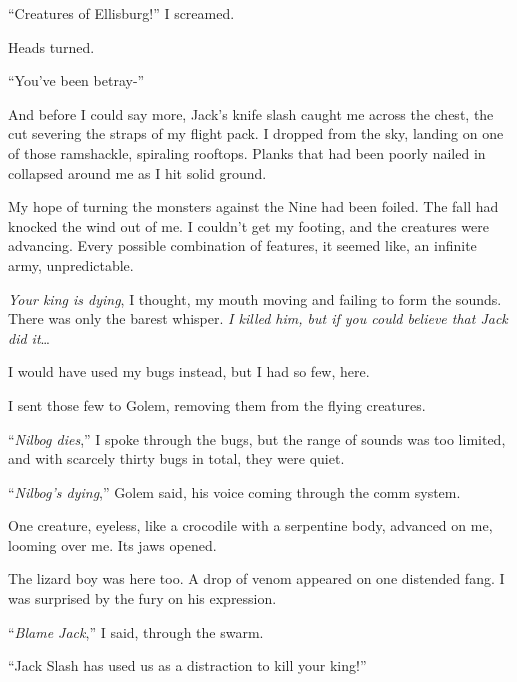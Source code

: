 ``Creatures of Ellisburg!'' I screamed.



Heads turned.



``You've been betray-''



And before I could say more, Jack's knife slash caught me across the chest, the cut severing the straps of my flight pack.  I dropped from the sky, landing on one of those ramshackle, spiraling rooftops.  Planks that had been poorly nailed in collapsed around me as I hit solid ground.



My hope of turning the monsters against the Nine had been foiled.  The fall had knocked the wind out of me.  I couldn't get my footing, and the creatures were advancing.  Every possible combination of features, it seemed like, an infinite army, unpredictable.



\emph{Your king is dying}, I thought, my mouth moving and failing to form the sounds.  There was only the barest whisper.  \emph{I killed him, but if you could believe that Jack did it}\ldots



I would have used my bugs instead, but I had so few, here.



I sent those few to Golem, removing them from the flying creatures.



``\emph{Nilbog dies},'' I spoke through the bugs, but the range of sounds was too limited, and with scarcely thirty bugs in total, they were quiet.



``\emph{Nilbog's dying},'' Golem said, his voice coming through the comm system.



One creature, eyeless, like a crocodile with a serpentine body, advanced on me, looming over me.  Its jaws opened.



The lizard boy was here too.  A drop of venom appeared on one distended fang.  I was surprised by the fury on his expression.



``\emph{Blame Jack},'' I said, through the swarm.



``Jack Slash has used us as a distraction to kill your king!''



